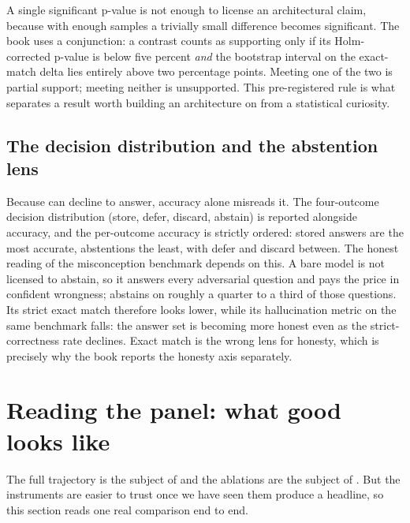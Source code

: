 \begin{intuition}
A single significant p-value is not enough to license an architectural claim, because
with enough samples a trivially small difference becomes significant. The book uses a
conjunction: a contrast counts as supporting only if its Holm-corrected p-value is
below five percent \emph{and} the bootstrap interval on the exact-match delta lies
entirely above two percentage points. Meeting one of the two is partial support;
meeting neither is unsupported. This pre-registered rule is what separates a result
worth building an architecture on from a statistical curiosity.
\end{intuition}

\subsection*{The decision distribution and the abstention lens}

\begin{precise}
Because \caem{} can decline to answer, accuracy alone misreads it. The four-outcome
decision distribution (store, defer, discard, abstain) is reported alongside
accuracy, and the per-outcome accuracy is strictly ordered: stored answers are the
most accurate, abstentions the least, with defer and discard between. The honest
reading of the misconception benchmark depends on this. A bare model is not licensed
to abstain, so it answers every adversarial question and pays the price in confident
wrongness; \caem{} abstains on roughly a quarter to a third of those questions. Its
strict exact match therefore looks lower, while its hallucination metric on the same
benchmark falls: the answer set is becoming more honest even as the strict-correctness
rate declines. Exact match is the wrong lens for honesty, which is precisely why the
book reports the honesty axis separately.
\end{precise}

\section{Reading the panel: what good looks like}
\label{sec:bench-reading}

The full trajectory is the subject of  and the ablations are the
subject of . But the instruments are easier to trust once we have
seen them produce a headline, so this section reads one real comparison end to end.

